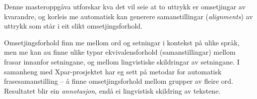\documentclass[12pt,a4paper,oneside,draft]{report}
\begin{document}
\label{SEC:innleiing}




Denne masteroppgåva utforskar kva det vil seie at to uttrykk er
 omsetjingar av kvarandre, og korleis me automatisk kan generere
 samanstillingar (\emph{alignments}) av uttrykk som står i eit slikt
 omsetjingsforhold.

Omsetjingsforhold finn me mellom ord og setningar i kontekst på ulike
 språk, men me kan au finne ulike typar ekvivalensforhold
 (samanstillingar) mellom frasar innanfor setningane, og mellom
 lingvistiske skildringar av setningane. I samanheng med
 Xpar-prosjektet \citep{xpar2008rcn,dyvik2009lmp} har eg sett på
 metodar for automatisk frasesamanstilling – å finne omsetjingsforhold
 mellom grupper av fleire ord. Resultatet blir ein \emph{annotasjon}, endå
 ei lingvistisk skildring av tekstene.
\end{document}
